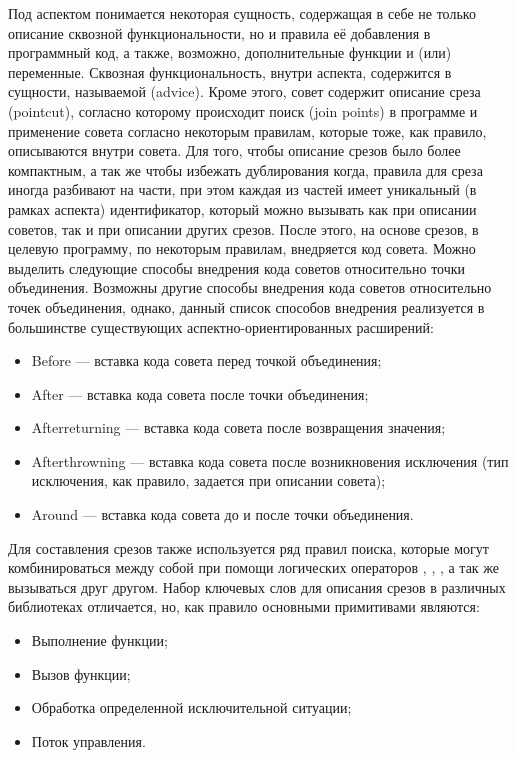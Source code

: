 Под аспектом понимается некоторая сущность, содержащая в себе не только описание
сквозной функциональности, но и правила её добавления в программный код, а
также, возможно, дополнительные функции и (или) переменные.
Сквозная функциональность, внутри аспекта, содержится в сущности, называемой
 (advice).
Кроме этого, совет содержит описание среза (pointcut), согласно которому
происходит поиск  (join points) в программе и применение
совета согласно некоторым правилам, которые тоже, как правило, описываются
внутри совета.
Для того, чтобы описание срезов было более компактным, а так же чтобы избежать
дублирования когда, правила для среза иногда разбивают на части, при этом каждая
из частей имеет уникальный (в рамках аспекта) идентификатор, который можно
вызывать как при описании советов, так и при описании других срезов.
После этого, на основе срезов, в целевую программу, по некоторым правилам,
внедряется код совета.
Можно выделить следующие способы внедрения кода советов относительно точки
объединения.
Возможны другие способы внедрения кода советов относительно точек объединения, однако, данный список способов внедрения реализуется в большинстве существующих аспектно-ориентированных расширений:
\begin{itemize}
  \item Before --- вставка кода совета перед точкой объединения;
  \item After --- вставка кода совета после точки объединения;
  \item Afterreturning --- вставка кода совета после возвращения значения;
  \item Afterthrowning --- вставка кода совета после возникновения исключения
    (тип исключения, как правило, задается при описании совета);
  \item Around --- вставка кода совета до и после точки объединения.
\end{itemize}

Для составления срезов также используется ряд правил поиска, которые могут
комбинироваться между собой при помощи логических операторов ,
, , а так же вызываться друг другом.
Набор ключевых слов для описания срезов в различных библиотеках отличается, но,
как правило основными примитивами являются:
\begin{itemize}
  \item Выполнение функции;
  \item Вызов функции;
  \item Обработка определенной исключительной ситуации;
  \item Поток управления.
\end{itemize}


